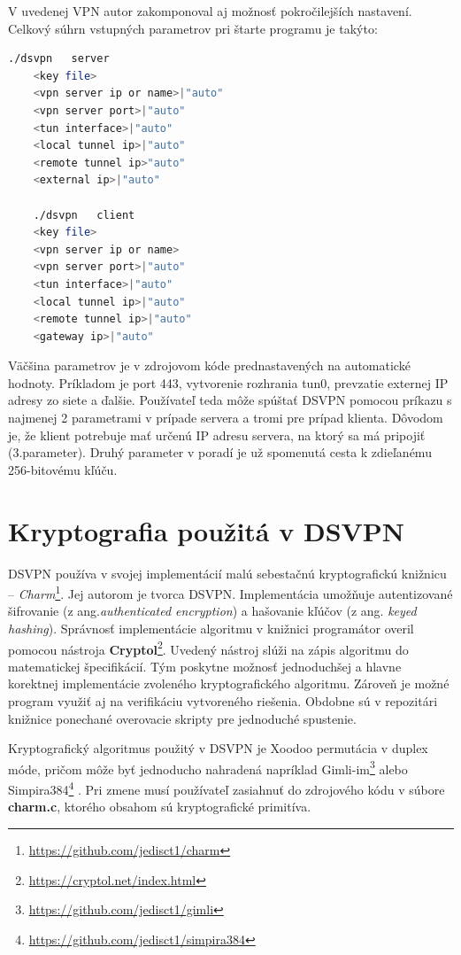 V uvedenej VPN autor zakomponoval aj možnosť pokročilejších nastavení. Celkový súhrn vstupných parametrov pri štarte programu je takýto:
\begin{lstlisting}[language=bash]
	./dsvpn   server
	<key file>
	<vpn server ip or name>|"auto"
	<vpn server port>|"auto"
	<tun interface>|"auto"
	<local tunnel ip>|"auto"
	<remote tunnel ip>"auto"
	<external ip>|"auto"

	./dsvpn   client
	<key file>
	<vpn server ip or name>
	<vpn server port>|"auto"
	<tun interface>|"auto"
	<local tunnel ip>|"auto"
	<remote tunnel ip>|"auto"
	<gateway ip>|"auto"
	\end{lstlisting} 
Väčšina parametrov je v zdrojovom kóde prednastavených na automatické hodnoty. Príkladom je port 443, vytvorenie rozhrania tun0, prevzatie externej IP adresy zo siete a ďalšie. Používateľ teda môže spúštať DSVPN pomocou príkazu s najmenej 2 parametrami v prípade servera a tromi pre prípad klienta. Dôvodom je, že klient potrebuje mať určenú IP adresu servera, na ktorý sa má pripojiť (3.parameter). Druhý parameter v poradí je už spomenutá cesta k zdieľanému 256-bitovému kľúču.   

\section{Kryptografia použitá v DSVPN}
DSVPN používa v svojej implementácií malú sebestačnú kryptografickú knižnicu -- \textit{Charm}\footnote{\url{https://github.com/jedisct1/charm}}. Jej autorom je tvorca DSVPN. Implementácia umožňuje autentizované šifrovanie (z ang.\textit{authenticated encryption}) a hašovanie kľúčov (z ang. \textit{keyed hashing}). Správnosť implementácie algoritmu v knižnici programátor overil pomocou nástroja \textbf{Cryptol}\footnote{\url{https://cryptol.net/index.html}}. Uvedený nástroj slúži na zápis algoritmu do matematickej špecifikácií. Tým poskytne možnosť jednoduchšej a hlavne korektnej implementácie zvoleného kryptografického algoritmu. Zároveň je možné program využiť aj na verifikáciu vytvoreného riešenia. Obdobne sú v repozitári knižnice ponechané overovacie skripty pre jednoduché spustenie. 

Kryptografický algoritmus použitý v DSVPN je Xoodoo permutácia v duplex móde, pričom môže byť jednoducho nahradená napríklad Gimli-im\footnote{\url{https://github.com/jedisct1/gimli}} \cite{gimli} alebo Simpira384\footnote{\url{https://github.com/jedisct1/simpira384}} \cite{simpira}. Pri zmene musí používateľ zasiahnuť do zdrojového kódu v súbore \textbf{charm.c}, ktorého obsahom sú kryptografické primitíva.     
